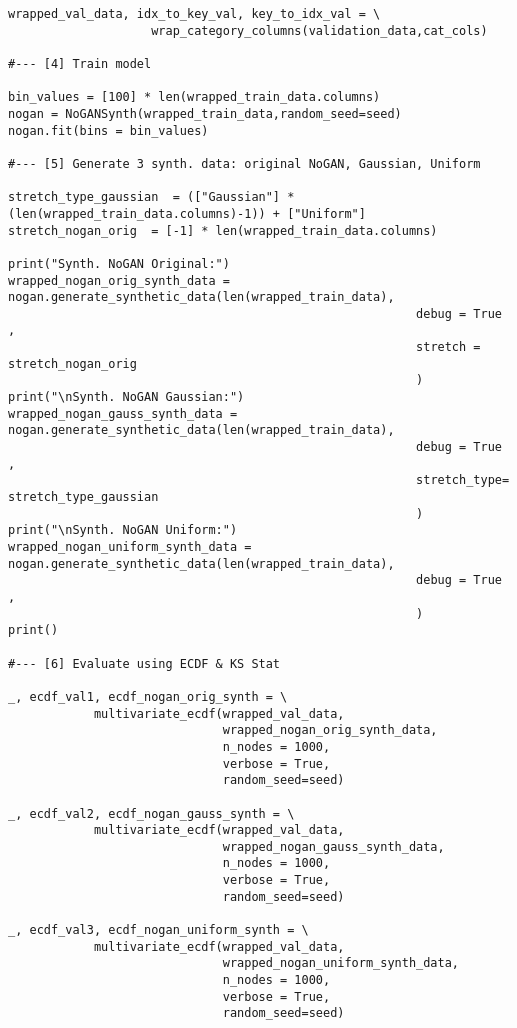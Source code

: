 \documentclass[oneside,10pt]{book}
\begin{document}
\begin{lstlisting}
wrapped_val_data, idx_to_key_val, key_to_idx_val = \
                    wrap_category_columns(validation_data,cat_cols)     

#--- [4] Train model

bin_values = [100] * len(wrapped_train_data.columns) 
nogan = NoGANSynth(wrapped_train_data,random_seed=seed)
nogan.fit(bins = bin_values)

#--- [5] Generate 3 synth. data: original NoGAN, Gaussian, Uniform

stretch_type_gaussian  = (["Gaussian"] * (len(wrapped_train_data.columns)-1)) + ["Uniform"]
stretch_nogan_orig  = [-1] * len(wrapped_train_data.columns)

print("Synth. NoGAN Original:")
wrapped_nogan_orig_synth_data = nogan.generate_synthetic_data(len(wrapped_train_data),
                                                         debug = True ,
                                                         stretch = stretch_nogan_orig
                                                         )
print("\nSynth. NoGAN Gaussian:")
wrapped_nogan_gauss_synth_data = nogan.generate_synthetic_data(len(wrapped_train_data),
                                                         debug = True ,
                                                         stretch_type= stretch_type_gaussian
                                                         )
print("\nSynth. NoGAN Uniform:")
wrapped_nogan_uniform_synth_data = nogan.generate_synthetic_data(len(wrapped_train_data),
                                                         debug = True ,
                                                         )
print()

#--- [6] Evaluate using ECDF & KS Stat

_, ecdf_val1, ecdf_nogan_orig_synth = \
            multivariate_ecdf(wrapped_val_data, 
                              wrapped_nogan_orig_synth_data, 
                              n_nodes = 1000, 
                              verbose = True,
                              random_seed=seed)

_, ecdf_val2, ecdf_nogan_gauss_synth = \
            multivariate_ecdf(wrapped_val_data, 
                              wrapped_nogan_gauss_synth_data, 
                              n_nodes = 1000, 
                              verbose = True,
                              random_seed=seed)            

_, ecdf_val3, ecdf_nogan_uniform_synth = \
            multivariate_ecdf(wrapped_val_data, 
                              wrapped_nogan_uniform_synth_data, 
                              n_nodes = 1000, 
                              verbose = True,
                              random_seed=seed)
            

\end{lstlisting}
\end{document}
